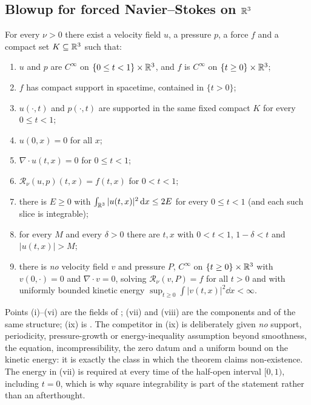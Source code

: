 \subsection{Blowup for forced Navier--Stokes on $\mathbb{R}^3$}
\label{sec:r3}

\begin{theorem}
\label{thm:ns-r3}
For every $\nu>0$ there exist a velocity field $u$, a pressure $p$, a force $f$ and a
compact set $K\subseteq\mathbb{R}^3$ such that:
\begin{enumerate}[label=\textup{(i\arabic*)}]
  \item $u$ and $p$ are $C^\infty$ on $\{0\le t<1\}\times\mathbb{R}^3$, and $f$ is
        $C^\infty$ on $\{t\ge 0\}\times\mathbb{R}^3$;
  \item $f$ has compact support in spacetime, contained in $\{t>0\}$;
  \item $u(\cdot,t)$ and $p(\cdot,t)$ are supported in the same fixed compact $K$ for
        every $0\le t<1$;
  \item $u(0,x)=0$ for all $x$;
  \item $\nabla\cdot u(t,x)=0$ for $0\le t<1$;
  \item $\mathcal{R}_\nu(u,p)(t,x)=f(t,x)$ for $0<t<1$;
  \item there is $E\ge 0$ with $\int_{\mathbb{R}^3}|u(t,x)|^2\,\mathrm{d} x \le 2E$ for every
        $0\le t<1$ (and each such slice is integrable);
  \item for every $M$ and every $\delta>0$ there are $t,x$ with $0<t<1$,
        $1-\delta<t$ and $|u(t,x)|>M$;
  \item there is \emph{no} velocity field $v$ and pressure $P$, $C^\infty$ on
        $\{t\ge 0\}\times\mathbb{R}^3$ with $v(0,\cdot)=0$ and $\nabla\cdot v=0$, solving
        $\mathcal{R}_\nu(v,P)=f$ for all $t>0$ and with uniformly bounded kinetic
        energy $\sup_{t\ge0}\int|v(t,x)|^2\dd x<\infty$.
\end{enumerate}
\end{theorem}

Points (i)--(vi) are the fields  of
; (vii) and (viii) are the components
 and  of the same structure; (ix) is
. The competitor in (ix) is
deliberately given \emph{no} support, periodicity, pressure-growth or energy-inequality
assumption beyond smoothness, the equation, incompressibility, the zero datum and a
uniform bound on the kinetic energy: it is exactly the class in which the theorem
claims non-existence. The energy in (vii) is required at every time of the half-open
interval $[0,1)$, including $t=0$, which is why square integrability is part of the
statement rather than an afterthought.

